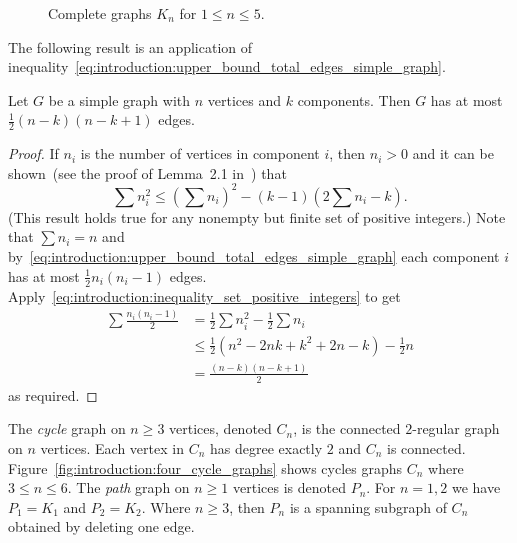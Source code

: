 \begin{figure}[!htbp]
\centering

\caption{Complete graphs $K_n$ for $1 \leq n \leq 5$.}
\label{fig:introduction:five_complete_graphs}
\end{figure}

The following result is an application of
inequality~\eqref{eq:introduction:upper_bound_total_edges_simple_graph}.

\begin{theorem}
Let $G$ be a simple graph with $n$ vertices and $k$ components. Then
$G$ has at most $\frac{1}{2} (n - k)(n - k + 1)$ edges.
\end{theorem}

\begin{proof}
If $n_i$ is the number of vertices in component $i$, then $n_i > 0$
and it can be shown~(see the proof of Lemma~2.1
in~\cite[pp.21--22]{Foulds1992}) that
%
\begin{equation}
\label{eq:introduction:inequality_set_positive_integers}
\sum n_i^2
\leq
\left(\sum n_i\right)^2 - (k - 1) \left(2 \sum n_i - k\right).
\end{equation}
%
(This result holds true for any nonempty but finite set of positive
integers.) Note that $\sum n_i = n$ and
by~\eqref{eq:introduction:upper_bound_total_edges_simple_graph} each
component $i$ has at most $\frac{1}{2} n_i (n_i - 1)$
edges. Apply~\eqref{eq:introduction:inequality_set_positive_integers}
to get
%
\begin{align*}
\sum \frac{n_i (n_i - 1)}{2}
&=
\frac{1}{2} \sum n_i^2 - \frac{1}{2} \sum n_i \\[4pt]
&\leq
\frac{1}{2} (n^2 - 2nk + k^2 + 2n - k) - \frac{1}{2} n \\[4pt]
&=
\frac{(n - k) (n - k + 1)}{2}
\end{align*}
%
as required.
\end{proof}

The \emph{cycle} graph on $n \geq 3$ vertices, denoted $C_n$, is the
connected $2$-regular graph on $n$ vertices. Each vertex in $C_n$ has
degree exactly $2$ and $C_n$ is
connected. Figure~\ref{fig:introduction:four_cycle_graphs} shows
cycles graphs $C_n$ where $3 \leq n \leq 6$. The \emph{path} graph on
$n \geq 1$ vertices is denoted $P_n$. For $n = 1, 2$ we have
$P_1 = K_1$ and $P_2 = K_2$. Where $n \geq 3$, then $P_n$ is a
spanning subgraph of $C_n$ obtained by deleting one edge.

